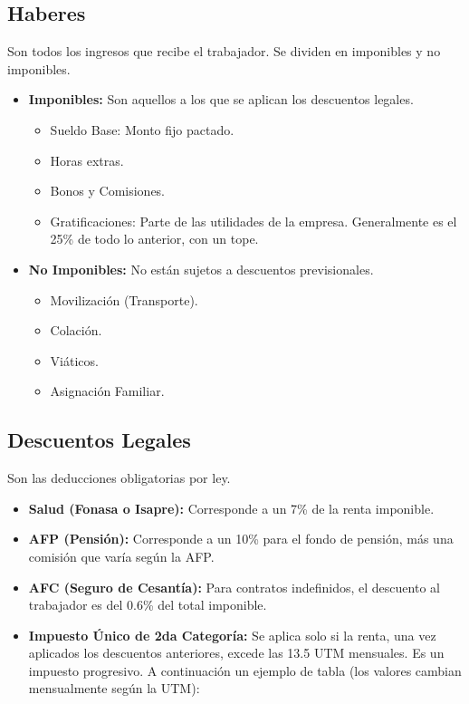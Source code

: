 \documentclass[11pt]{article}
\begin{document}
\subsection{Haberes}
Son todos los ingresos que recibe el trabajador. Se dividen en imponibles y no imponibles.
\begin{itemize}
    \item \textbf{Imponibles:} Son aquellos a los que se aplican los descuentos legales.
        \begin{itemize}
            \item Sueldo Base: Monto fijo pactado.
            \item Horas extras.
            \item Bonos y Comisiones.
            \item Gratificaciones: Parte de las utilidades de la empresa. Generalmente es el 25\% de todo lo anterior, con un tope.
        \end{itemize}
    \item \textbf{No Imponibles:} No están sujetos a descuentos previsionales.
        \begin{itemize}
            \item Movilización (Transporte).
            \item Colación.
            \item Viáticos.
            \item Asignación Familiar.
        \end{itemize}
\end{itemize}

\subsection{Descuentos Legales}
Son las deducciones obligatorias por ley.
\begin{itemize}
    \item \textbf{Salud (Fonasa o Isapre):} Corresponde a un 7\% de la renta imponible.
    \item \textbf{AFP (Pensión):} Corresponde a un 10\% para el fondo de pensión, más una comisión que varía según la AFP.
    \item \textbf{AFC (Seguro de Cesantía):} Para contratos indefinidos, el descuento al trabajador es del 0.6\% del total imponible.
    \item \textbf{Impuesto Único de 2da Categoría:} Se aplica solo si la renta, una vez aplicados los descuentos anteriores, excede las 13.5 UTM mensuales. Es un impuesto progresivo. A continuación un ejemplo de tabla (los valores cambian mensualmente según la UTM):
\end{itemize}
\end{document}
